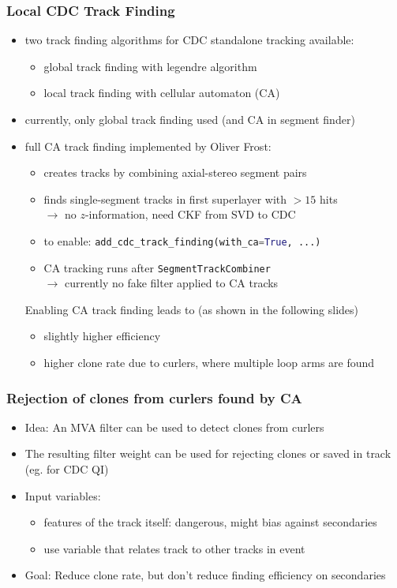 \documentclass[18pt]{beamer}
\newcommand\pro{\item[$\oplus$]}
\newcommand\con{\item[$\ominus$]}
\begin{document}
\begin{frame}
  \frametitle{Local CDC Track Finding}
  \begin{itemize}
  \item two track finding algorithms for CDC standalone tracking available:\\
    \begin{itemize}
    \item global track finding with legendre algorithm
    \item local track finding with cellular automaton (CA)
    \end{itemize}
  \item currently, only global track finding used (and CA in segment finder)
  \item full CA track finding implemented by Oliver Frost:
    \begin{itemize}
    \item creates tracks by combining axial-stereo segment pairs
    \item finds single-segment tracks in first superlayer with $> 15$ hits\\
      $\rightarrow$ no $z$-information, need CKF from SVD to CDC
    \item to enable: \lstinline[basicstyle=\ttfamily, language=Python]{add_cdc_track_finding(with_ca=True, ...)}
    \item CA tracking runs after \texttt{SegmentTrackCombiner}\\
      $\rightarrow$ currently no fake filter applied to CA tracks
    \end{itemize}
    \begin{block}{Enabling CA track finding leads to (as shown in the following slides)}
      \begin{itemize}
      \pro slightly higher efficiency
      \con higher clone rate due to curlers, where multiple loop arms are found
      \end{itemize}
    \end{block}
  \end{itemize}
\end{frame}

\begin{frame}
  \frametitle{Rejection of clones from curlers found by CA}
  \begin{itemize}
  \item Idea: An MVA filter can be used to detect clones from curlers
  \item The resulting filter weight can be used for rejecting clones or saved in track (eg. for CDC QI)
  \item Input variables:
    \begin{itemize}
    \item features of the track itself: dangerous, might bias against secondaries
    \item use variable that relates track to other tracks in event
    \end{itemize}
  \item Goal: Reduce clone rate, but don't reduce finding efficiency on secondaries
  \end{itemize}
\end{frame}
\end{document}
